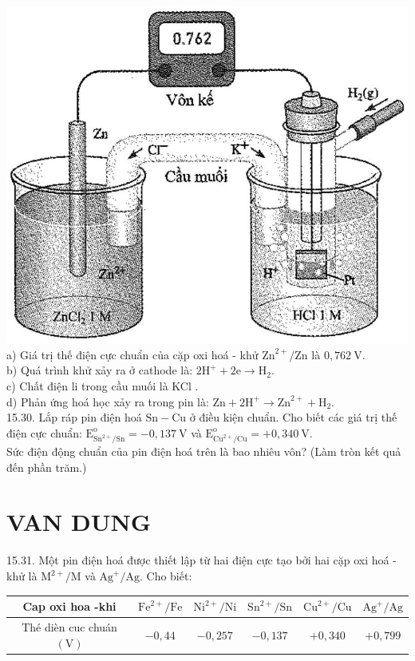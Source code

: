 \documentclass[10pt]{article}
\begin{document}
\includegraphics[max width=\textwidth, center]{2025_10_23_74efce88ce3a451fd6b0g-048(1)}\\
a) Giá trị thế điện cực chuẩn của cặp oxi hoá - khử $\mathrm{Zn}^{2+} / \mathrm{Zn}$ là $0,762 \mathrm{~V}$.\\
b) Quá trình khử xảy ra ở cathode là: $2 \mathrm{H}^{+}+2 \mathrm{e} \rightarrow \mathrm{H}_{2}$.\\
c) Chất điện li trong cầu muối là KCl .\\
d) Phản ứng hoá học xảy ra trong pin là: $\mathrm{Zn}+2 \mathrm{H}^{+} \rightarrow \mathrm{Zn}^{2+}+\mathrm{H}_{2}$.\\
15.30. Lắp ráp pin điện hoá $\mathrm{Sn}-\mathrm{Cu}$ ở điều kiện chuẩn. Cho biết các giá trị thế điện cực chuẩn: $\mathrm{E}_{\mathrm{Sn}^{2+} / \mathrm{Sn}}^{\mathrm{o}}=-0,137 \mathrm{~V}$ và $\mathrm{E}_{\mathrm{Cu}^{2+} / \mathrm{Cu}}^{\mathrm{o}}=+0,340 \mathrm{~V}$.\\
Sức điện động chuẩn của pin điện hoá trên là bao nhiêu vôn? (Làm tròn kết quả đến phần trăm.)

\section*{VAN DUNG}
15.31. Một pin điện hoá được thiết lập từ hai điện cực tạo bởi hai cặp oxi hoá - khử là $\mathrm{M}^{2+} / \mathrm{M}$ và $\mathrm{Ag}^{+} / \mathrm{Ag}$. Cho biết:

\begin{center}
\begin{tabular}{|cc|c|c|c|c|}
\hline
Cap oxi hoa -khi & $\mathrm{Fe}^{2+} / \mathrm{Fe}$ & $\mathrm{Ni}^{2+} / \mathrm{Ni}$ & $\mathrm{Sn}^{2+} / \mathrm{Sn}$ & $\mathrm{Cu}^{2+} / \mathrm{Cu}$ & $\mathrm{Ag}^{+} / \mathrm{Ag}$ \\
\hline
Thé dièn cuc chuán $(\mathrm{V})$ & $-0,44$ & $-0,257$ & $-0,137$ & $+0,340$ & $+0,799$ \\
\hline
\end{tabular}
\end{center}
\end{document}

